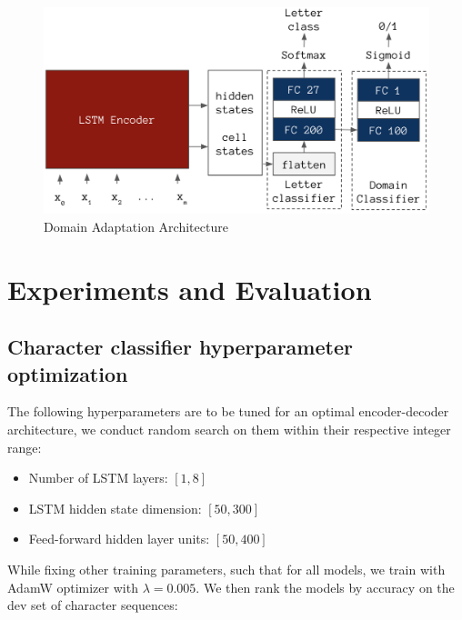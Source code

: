 \documentclass{article}
\begin{document}
\begin{multicols*}{2}
\begin{figure}[H]
    \centering
    \includegraphics[scale = 0.3]{da.png}
    \caption{Domain Adaptation Architecture}
    \label{fig:da}
\end{figure}


\section{Experiments and Evaluation}

\subsection{Character classifier hyperparameter optimization}

The following hyperparameters are to be tuned for an optimal encoder-decoder architecture, we conduct random search on them within their respective integer range:

\vspace{-1mm}
\begin{itemize}[leftmargin=*, itemsep=0mm]
    \item Number of LSTM layers: $[1,8]$
    \item LSTM hidden state dimension: $[50,300]$
    \item Feed-forward hidden layer units: $[50,400]$
\end{itemize}
\vspace{-1mm}

While fixing other training parameters, such that for all models, we train with AdamW optimizer \cite{kingma2014adam} with $\lambda = 0.005$. We then rank the models by accuracy on the dev set of character sequences:


\end{multicols*}
\end{document}
